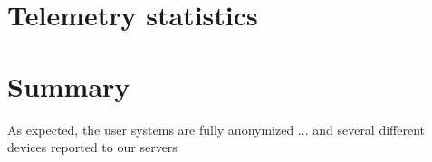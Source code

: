 %


\section{Telemetry statistics}
\label{sec:results:telemetry}
%


\section{Summary}
As expected, the user systems are fully anonymized ... and several different devices reported to our servers
